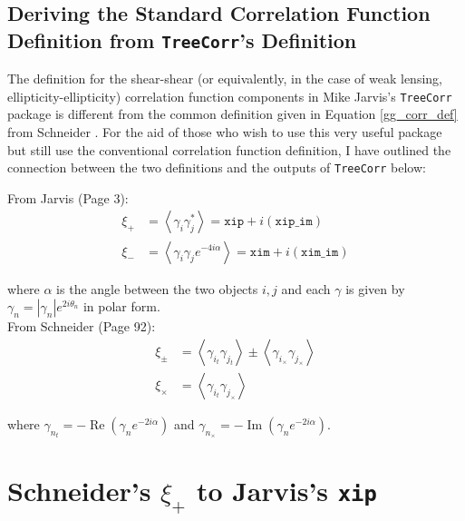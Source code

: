 \documentclass[%
 reprint,
 amsmath,amssymb,
 aps,nofootinbib
]{revtex4-1}
\begin{document}

\newpage

\subsection{Deriving the Standard Correlation Function Definition from \texttt{TreeCorr}'s Definition} \label{corr_defs}

The definition for the shear-shear (or equivalently, in the case of weak lensing, ellipticity-ellipticity) correlation function components in Mike Jarvis's \texttt{TreeCorr} package is different from the common definition given in Equation \eqref{gg_corr_def} from Schneider \cite{schneider}. For the aid of those who wish to use this very useful package but still use the conventional correlation function definition, I have outlined the connection between the two definitions and the outputs of \texttt{TreeCorr} below:

\setlength\parindent{0pt}

\vspace{0.25 in}

From Jarvis \cite{jarvis} (Page 3):
\begin{align}
\xi_+&=\left<\gamma_i\gamma_j^*\right>=\texttt{xip}+i(\texttt{xip\_im})\label{s+}\\
\xi_-&=\left<\gamma_i\gamma_je^{-4i\alpha}\right>=\texttt{xim}+i(\texttt{xim\_im})\label{s-}
\end{align}

where $\alpha$ is the angle between the two objects $i,j$ and each $\gamma$ is given by $\gamma_n=|\gamma_n|e^{2i\theta_n}$ in polar form.\\

From Schneider \cite{schneider} (Page 92):
\begin{align}
\xi_\pm&=\left<\gamma_{i_t}\gamma_{j_t}\right>\pm\left<\gamma_{i_\times}\gamma_{j_\times}\right>\label{s+-}\\
\xi_\times&=\left<\gamma_{i_t}\gamma_{j_\times}\right>\label{sx}
\end{align}

where $\gamma_{n_t}=-\operatorname{Re}\left(\gamma_n e^{-2i\alpha}\right)$ and $\gamma_{n_\times}=-\operatorname{Im}\left(\gamma_n e^{-2i\alpha}\right)$.\\

\section*{Schneider's $\xi_+$ to Jarvis's \texttt{xip}}
\end{document}
